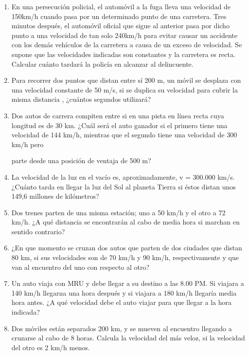 \documentclass[a5paper,pagesize,10pt,bibtotoc,pointlessnumbers,
normalheadings,DIV=9,fleqn,x11names,table,twoside=false]{scrbook}
\begin{document}
\begin{enumerate}
\item En una persecución policial, el automóvil a la fuga lleva una velocidad de 150km/h cuando
 pasa por un determinado punto 
de una carretera. Tres minutos después, el automóvil oficial que sigue al
 anterior pasa por dicho punto a una velocidad de tan 
solo 240km/h para evitar causar un accidente con los
 demás vehículos de la carretera a causa de un exceso de velocidad. Se 
supone que las velocidades indicadas
 son constantes y la carretera es recta. Calcular cuánto tardará la policía en alcanzar 
al delincuente.


\item Para recorrer dos puntos que distan entre sí 200 m, un
 móvil se desplaza con una velocidad constante de 50 m/s, si se 
duplica su velocidad para
 cubrir la misma distancia , ¿cuántos segundos utilizará?

\item  Dos autos de carrera compiten entre si
 en una pista en
 línea recta cuya longitud es de 30 km. ¿Cuál será el auto 
ganador si el primero tiene una
 velocidad de 144 km/h, mientras que el segundo tiene una velocidad de 300 km/h pero

parte desde una posición de ventaja de 500 m?

\item  La velocidad de la luz en el vacío es, 
aproximadamente, v = 300.000 km/s. ¿Cuánto tarda en llegar la luz del Sol al 
planeta Tierra si éstos 
distan unos 149,6 millones de kilómetros?


\item  Dos trenes parten de una misma
 estación; uno a 50 km/h y el otro a 72 km/h. ¿A qué distancia se encontrarán al cabo de 
media
 hora si marchan en sentido contrario? 


\item  ¿En que momento se cruzan dos 
 autos que parten de dos ciudades que distan 80 km, si sus velocidades son de 70 km/h y 90 
km/h, 
respectivamente y que van al encuentro del uno con respecto al otro?

\item  Un auto viaja con MRU y debe llegar a su destino a las
 8.00 PM. Si viajara a 140 km/h llegarııa una hora después y si 
viajara a 180 km/h llegaría
 media hora antes. ¿A qué velocidad debe el auto viajar para que llegar a la hora indicada?

\item Dos
 móviles están separados 200 km, y se mueven al encuentro llegando a cruzarse al cabo
 de 8 horas. Calcula la velocidad 
del más veloz, si la velocidad del otro es 2 km/h menos. 
\end{enumerate}
\end{document}
